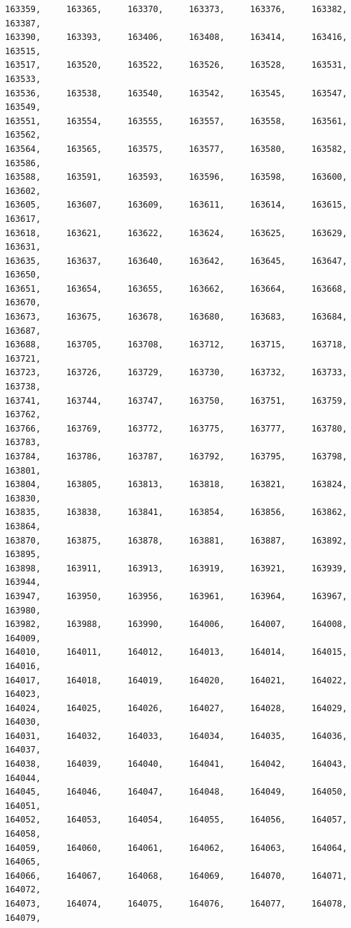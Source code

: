 \documentclass[a4paper,11pt]{report}
\begin{document}
\begin{verbatim}
163359,     163365,     163370,     163373,     163376,     163382,     163387,
163390,     163393,     163406,     163408,     163414,     163416,     163515,
163517,     163520,     163522,     163526,     163528,     163531,     163533,
163536,     163538,     163540,     163542,     163545,     163547,     163549,
163551,     163554,     163555,     163557,     163558,     163561,     163562,
163564,     163565,     163575,     163577,     163580,     163582,     163586,
163588,     163591,     163593,     163596,     163598,     163600,     163602,
163605,     163607,     163609,     163611,     163614,     163615,     163617,
163618,     163621,     163622,     163624,     163625,     163629,     163631,
163635,     163637,     163640,     163642,     163645,     163647,     163650,
163651,     163654,     163655,     163662,     163664,     163668,     163670,
163673,     163675,     163678,     163680,     163683,     163684,     163687,
163688,     163705,     163708,     163712,     163715,     163718,     163721,
163723,     163726,     163729,     163730,     163732,     163733,     163738,
163741,     163744,     163747,     163750,     163751,     163759,     163762,
163766,     163769,     163772,     163775,     163777,     163780,     163783,
163784,     163786,     163787,     163792,     163795,     163798,     163801,
163804,     163805,     163813,     163818,     163821,     163824,     163830,
163835,     163838,     163841,     163854,     163856,     163862,     163864,
163870,     163875,     163878,     163881,     163887,     163892,     163895,
163898,     163911,     163913,     163919,     163921,     163939,     163944,
163947,     163950,     163956,     163961,     163964,     163967,     163980,
163982,     163988,     163990,     164006,     164007,     164008,     164009,
164010,     164011,     164012,     164013,     164014,     164015,     164016,
164017,     164018,     164019,     164020,     164021,     164022,     164023,
164024,     164025,     164026,     164027,     164028,     164029,     164030,
164031,     164032,     164033,     164034,     164035,     164036,     164037,
164038,     164039,     164040,     164041,     164042,     164043,     164044,
164045,     164046,     164047,     164048,     164049,     164050,     164051,
164052,     164053,     164054,     164055,     164056,     164057,     164058,
164059,     164060,     164061,     164062,     164063,     164064,     164065,
164066,     164067,     164068,     164069,     164070,     164071,     164072,
164073,     164074,     164075,     164076,     164077,     164078,     164079,

\end{verbatim}
\end{document}
